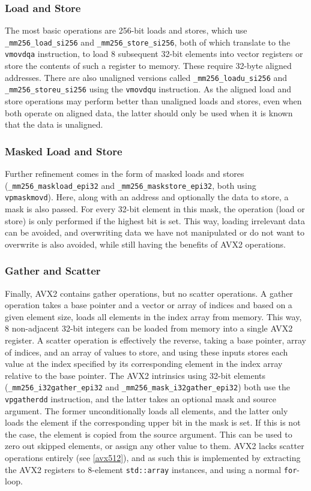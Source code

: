 \documentclass[11pt,dvipsnames]{article}
\newcommand{\icpp}[1]{\texttt{#1}}
\newcommand{\mono}[1]{\texttt{#1}}
\begin{document}
\subsubsection*{Load and Store}
The most basic operations are 256-bit loads and stores, which use \icpp{_mm256_load_si256} and \icpp{_mm256_store_si256}, both of which translate to the \mono{vmovdqa} instruction, to load 8 subsequent 32-bit elements into vector registers or store the contents of such a register to memory. These require 32-byte aligned addresses. There are also unaligned versions called \icpp{_mm256_loadu_si256} and \icpp{_mm256_storeu_si256} using the \mono{vmovdqu} instruction. As the aligned load and store operations may perform better than unaligned loads and stores, even when both operate on aligned data, the latter should only be used when it is known that the data is unaligned.

\subsubsection*{Masked Load and Store}
Further refinement comes in the form of masked loads and stores (\icpp{_mm256_maskload_epi32} and \icpp{_mm256_maskstore_epi32}, both using \mono{vpmaskmovd}). Here, along with an address and optionally the data to store, a mask is also passed. For every 32-bit element in this mask, the operation (load or store) is only performed if the highest bit is set. This way, loading irrelevant data can be avoided, and overwriting data we have not manipulated or do not want to overwrite is also avoided, while still having the benefits of AVX2 operations.

\subsubsection*{Gather and Scatter}
Finally, AVX2 contains gather operations, but no scatter operations. A gather operation takes a base pointer and a vector or array of indices and based on a given element size, loads all elements in the index array from memory. This way, 8 non-adjacent 32-bit integers can be loaded from memory into a single AVX2 register. A scatter operation is effectively the reverse, taking a base pointer, array of indices, and an array of values to store, and using these inputs stores each value at the index specified by its corresponding element in the index array relative to the base pointer. The AVX2 intrinsics using 32-bit elements (\icpp{_mm256_i32gather_epi32} and \icpp{_mm256_mask_i32gather_epi32}) both use the \mono{vpgatherdd} instruction, and the latter takes an optional mask and source argument. The former unconditionally loads all elements, and the latter only loads the element if the corresponding upper bit in the mask is set. If this is not the case, the element is copied from the source argument. This can be used to zero out skipped elements, or assign any other value to them. AVX2 lacks scatter operations entirely (see \autoref{avx512}), and as such this is implemented by extracting the AVX2 registers to 8-element \icpp{std::array} instances, and using a normal \icpp{for}-loop.
\end{document}
